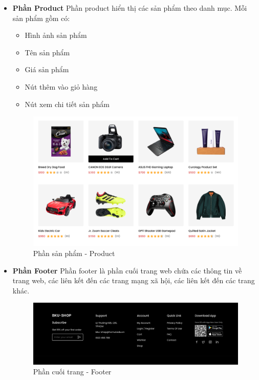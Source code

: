 \begin{itemize}
\begin{figure}[H]
    \end{figure}
    \item \textbf{Phần Product}
    \newline
    Phần product hiển thị các sản phẩm theo danh mục. Mỗi sản phẩm gồm có:
    \begin{itemize}
        \item Hình ảnh sản phẩm
        \item Tên sản phẩm
        \item Giá sản phẩm
        \item Nút thêm vào giỏ hàng
        \item Nút xem chi tiết sản phẩm
    \end{itemize}
    \begin{figure}[H]
        \begin{center}
        \includegraphics[scale=0.7]{images/hieu/chap-4/product.png}
        \vspace*{5mm}
        \caption{Phần sản phẩm - Product}
        \end{center}
    \end{figure}
    \item \textbf{Phần Footer}
    \newline
    Phần footer là phần cuối trang web chứa các thông tin về trang web, các liên kết đến các trang mạng xã hội, các liên kết đến các trang khác.
    \begin{figure}[H]
        \begin{center}
        \includegraphics[scale=0.5]{images/hieu/chap-4/footer.png}
        \vspace*{5mm}
        \caption{Phần cuối trang - Footer}
        \end{center}
    \end{figure}
\end{itemize}
